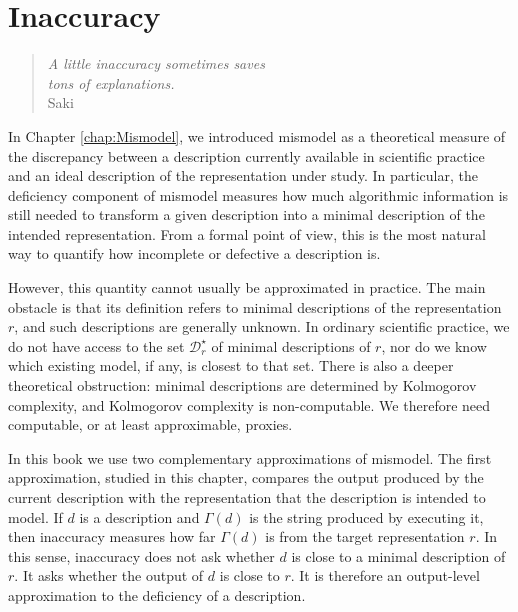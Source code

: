 %
%


\chapter{Inaccuracy}
\label{chap:Inaccuracy}

\begin{quote}
\begin{flushright}
\emph{A little inaccuracy sometimes saves\\
tons of explanations.}\\
Saki
\end{flushright}
\end{quote}
\bigskip


In Chapter \ref{chap:Mismodel}, we introduced mismodel as a theoretical measure of the discrepancy between a description currently available in scientific practice and an ideal description of the representation under study. In particular, the deficiency component of mismodel measures how much algorithmic information is still needed to transform a given description into a minimal description of the intended representation. From a formal point of view, this is the most natural way to quantify how incomplete or defective a description is.

However, this quantity cannot usually be approximated in practice. The main obstacle is that its definition refers to minimal descriptions of the representation $r$, and such descriptions are generally unknown. In ordinary scientific practice, we do not have access to the set $\mathcal D_r^\star$ of minimal descriptions of $r$, nor do we know which existing model, if any, is closest to that set. There is also a deeper theoretical obstruction: minimal descriptions are determined by Kolmogorov complexity, and Kolmogorov complexity is non-computable. We therefore need computable, or at least approximable, proxies.

In this book we use two complementary approximations of mismodel. The first approximation, studied in this chapter, compares the output produced by the current description with the representation that the description is intended to model. If $d$ is a description and $\Gamma(d)$ is the string produced by executing it, then inaccuracy measures how far $\Gamma(d)$ is from the target representation $r$. In this sense, inaccuracy does not ask whether $d$ is close to a minimal description of $r$. It asks whether the output of $d$ is close to $r$. It is therefore an output-level approximation to the deficiency of a description.

